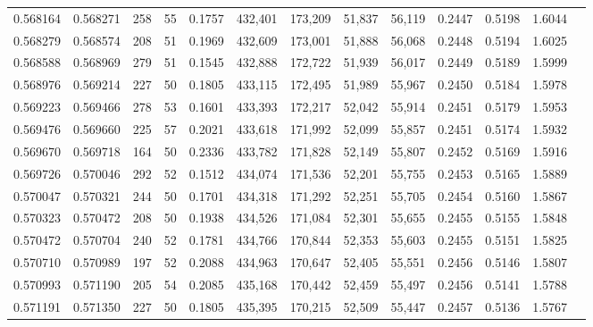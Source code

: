 \begin{tabular}{rrrrrrrrrrrrr}
0.568164 & 0.568271 &   258 &  55 &                                     0.1757 & 432,401 & 173,209 &  51,837 &  56,119 & 0.2447 & 0.5198 & 1.6044 \\
0.568279 & 0.568574 &   208 &  51 &                                     0.1969 & 432,609 & 173,001 &  51,888 &  56,068 & 0.2448 & 0.5194 & 1.6025 \\
0.568588 & 0.568969 &   279 &  51 &                                     0.1545 & 432,888 & 172,722 &  51,939 &  56,017 & 0.2449 & 0.5189 & 1.5999 \\
0.568976 & 0.569214 &   227 &  50 &                                     0.1805 & 433,115 & 172,495 &  51,989 &  55,967 & 0.2450 & 0.5184 & 1.5978 \\
0.569223 & 0.569466 &   278 &  53 &                                     0.1601 & 433,393 & 172,217 &  52,042 &  55,914 & 0.2451 & 0.5179 & 1.5953 \\
0.569476 & 0.569660 &   225 &  57 &                                     0.2021 & 433,618 & 171,992 &  52,099 &  55,857 & 0.2451 & 0.5174 & 1.5932 \\
0.569670 & 0.569718 &   164 &  50 &                                     0.2336 & 433,782 & 171,828 &  52,149 &  55,807 & 0.2452 & 0.5169 & 1.5916 \\
0.569726 & 0.570046 &   292 &  52 &                                     0.1512 & 434,074 & 171,536 &  52,201 &  55,755 & 0.2453 & 0.5165 & 1.5889 \\
0.570047 & 0.570321 &   244 &  50 &                                     0.1701 & 434,318 & 171,292 &  52,251 &  55,705 & 0.2454 & 0.5160 & 1.5867 \\
0.570323 & 0.570472 &   208 &  50 &                                     0.1938 & 434,526 & 171,084 &  52,301 &  55,655 & 0.2455 & 0.5155 & 1.5848 \\
0.570472 & 0.570704 &   240 &  52 &                                     0.1781 & 434,766 & 170,844 &  52,353 &  55,603 & 0.2455 & 0.5151 & 1.5825 \\
0.570710 & 0.570989 &   197 &  52 &                                     0.2088 & 434,963 & 170,647 &  52,405 &  55,551 & 0.2456 & 0.5146 & 1.5807 \\
0.570993 & 0.571190 &   205 &  54 &                                     0.2085 & 435,168 & 170,442 &  52,459 &  55,497 & 0.2456 & 0.5141 & 1.5788 \\
0.571191 & 0.571350 &   227 &  50 &                                     0.1805 & 435,395 & 170,215 &  52,509 &  55,447 & 0.2457 & 0.5136 & 1.5767 \\

\end{tabular}

